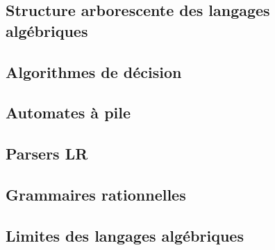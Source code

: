 \subsection{Structure arborescente des langages algébriques}




 
\subsection{Algorithmes de décision}




 
\subsection{Automates à pile}












\subsection{Parsers LR}


\subsection{Grammaires rationnelles}







 
\subsection{Limites des langages algébriques}



 

